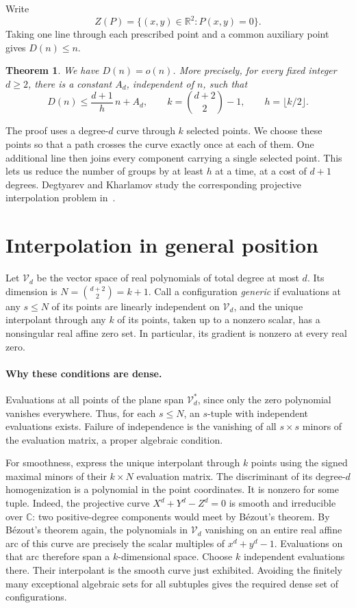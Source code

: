 \documentclass[11pt,letterpaper]{article}
\newcommand{\R}{\mathbb R}
\newcommand{\C}{\mathbb C}
\newcommand{\Vd}{\mathcal V_d}
\newtheorem*{theoremstar}{Theorem}
\begin{document}
Write
\[
Z(P)=\{(x,y)\in\R^2:P(x,y)=0\}.
\]
Taking one line through each prescribed point and a common auxiliary point gives $D(n)\leq n$.
\begin{theoremstar}
We have $D(n)=o(n)$. More precisely, for every fixed integer $d\geq2$, there is a constant $A_d$, independent of $n$, such that
\[
D(n)\leq\frac{d+1}{h}\,n+A_d,\qquad
k=\binom{d+2}{2}-1,\qquad h=\lfloor k/2\rfloor.
\]
\end{theoremstar}
The proof uses a degree-$d$ curve through $k$ selected points. We choose these points so that a path crosses the curve exactly once at each of them. One additional line then joins every component carrying a single selected point. This lets us reduce the number of groups by at least $h$ at a time, at a cost of $d+1$ degrees. Degtyarev and Kharlamov study the corresponding projective interpolation problem in~\cite[\S\S4.6--4.7]{dk2}.

\section{Interpolation in general position}
Let $\Vd$ be the vector space of real polynomials of total degree at most $d$. Its dimension is $N=\binom{d+2}{2}=k+1$. Call a configuration \emph{generic} if evaluations at any $s\leq N$ of its points are linearly independent on $\Vd$, and the unique interpolant through any $k$ of its points, taken up to a nonzero scalar, has a nonsingular real affine zero set. In particular, its gradient is nonzero at every real zero.

\paragraph{Why these conditions are dense.}
Evaluations at all points of the plane span $\Vd^*$, since only the zero polynomial vanishes everywhere. Thus, for each $s\leq N$, an $s$-tuple with independent evaluations exists. Failure of independence is the vanishing of all $s\times s$ minors of the evaluation matrix, a proper algebraic condition.

For smoothness, express the unique interpolant through $k$ points using the signed maximal minors of their $k\times N$ evaluation matrix. The discriminant of its degree-$d$ homogenization is a polynomial in the point coordinates. It is nonzero for some tuple. Indeed, the projective curve $X^d+Y^d-Z^d=0$ is smooth and irreducible over $\C$: two positive-degree components would meet by B\'ezout's theorem. By B\'ezout's theorem again, the polynomials in $\Vd$ vanishing on an entire real affine arc of this curve are precisely the scalar multiples of $x^d+y^d-1$. Evaluations on that arc therefore span a $k$-dimensional space. Choose $k$ independent evaluations there. Their interpolant is the smooth curve just exhibited. Avoiding the finitely many exceptional algebraic sets for all subtuples gives the required dense set of configurations.
\end{document}
